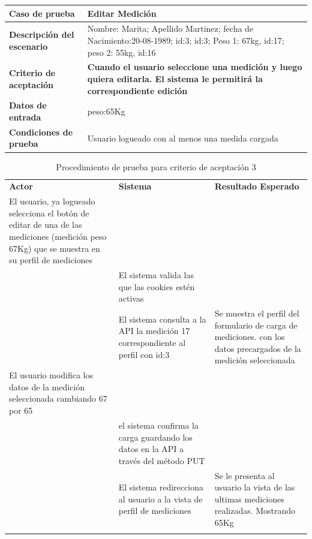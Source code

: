 
{\scriptsize
	\begin{table}[h]
	\centering
	\begin{tabular}{||l|p{10cm}||}
    	\rowcolor[gray]{0.9}
	    \hline 
        \hline 
	    \textbf{Caso de prueba} & \textbf{Editar Medición}\\  \hline
	    \textbf{Descripción del escenario}&  Nombre: Marita; Apellido Martinez; fecha de Nacimiento:20-08-1989; id:3; id:3; Peso 1: 67kg, id:17; peso 2: 55kg, id:16\\ \hline
	    \textbf{Criterio de aceptación}& \textbf{Cuando el usuario seleccione una medición  y luego quiera editarla. El sistema le permitirá la correspondiente edición}\\ \hline
        \textbf{Datos de entrada}& peso:65Kg \\ \hline
        \textbf{Condiciones de  prueba}& Usuario logueado con al menos una medida cargada \\ \hline \hline
	    \end{tabular}
	    \end{table}
	}
    

	\begin{longtable}{|p{5cm}|p{5cm}|p{4cm}|}
	    \hline \hline \rowcolor[gray]{0.9}
        \multicolumn{3}{||l|}{\textbf{Procedimiento de Prueba - Editar mediciones}} \\ \hline
	    \hline 
        \rowcolor[gray]{0.9}
	    \textbf{Actor} & \textbf{Sistema}& \textbf{Resultado Esperado} \\  \hline
	    El usuario, ya logueado selecciona el botón de editar de una de las mediciones (medición peso 67Kg) que se muestra en su perfil de mediciones& & \\ \hline
        & El sistema valida las que las cookies estén activas & \\ \hline
        & El sistema consulta a la API la medición 17 correspondiente al perfil con id:3 & Se muestra el perfil del formulario de carga de mediciones. con los datos precargados de la medición seleccionada\\ \hline        
	    El usuario modifica los datos de la medición seleccionada cambiando 67 por 65&  &\\ \hline
        & el sistema confirma la carga guardando los datos en la API a través del método PUT&\\ \hline
        &El sistema redirecciona al usuario a la vista de perfil de mediciones&  Se le presenta al usuario la vista de las ultimas mediciones realizadas. Mostrando 65Kg \\ \hline
        		\caption{Procedimiento de prueba para criterio de aceptación 3}
	    \end{longtable}
	
